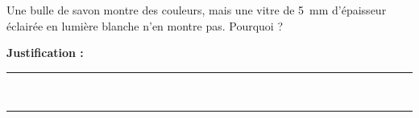 Une bulle de savon montre des couleurs, mais une vitre de \qty{5}{mm} d'épaisseur éclairée en lumière blanche n'en montre pas. Pourquoi ?

\choices

\noindent\textbf{Justification :} \hrulefill \\[2.5ex]
\rule{\linewidth}{0.4pt} \\[2.5ex]
\rule{\linewidth}{0.4pt}
\vfill
